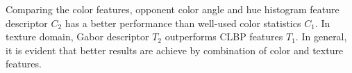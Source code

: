 Comparing the color features, opponent color angle and hue histogram feature descriptor $C_{2}$ has a better performance than well-used color statistics $C_{1}$. 
In texture domain, Gabor descriptor $T_{2}$ outperforms CLBP features $T_{1}$.
In general, it is evident that better results are achieve by combination of color and texture features. 



